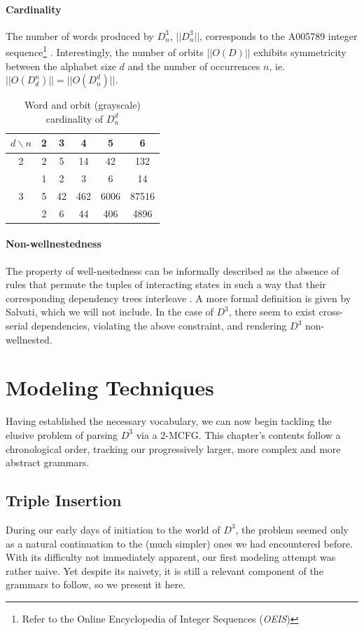 \documentclass[nonatbib,numbers,10pt]{sigplanconf}
\begin{document}
\paragraph{Cardinality}
The number of words produced by $D^3_n$, $| \! | D^3_n | \! |$, corresponds to the A005789 integer sequence\footnote{Refer to the Online Encyclopedia of Integer Sequences (\textit{OEIS})} \cite{moortgat}.
Interestingly, the number of orbits $| \! | O(D) | \! |$ exhibits symmetricity between the alphabet size $d$ and the number of occurrences $n$, ie. $| \! | O(D^n_d) | \! | = | \! | O(D^d_n) | \! |$.
\begin{table}[h!]
\begin{center}
\begin{tabular}{c | c c c c c }
$d \backslash n$ & 2 & 3 & 4 & 5 & 6\\
\hline
2 & 2 & 5 & 14 & 42 & 132\\
\rowcolor{Gray}
\ & 1 & 2 & 3 & 6 & 14\\
3 & 5 & 42 & 462 & 6006 & 87516\\
\rowcolor{Gray}
\ & 2 & 6 & 44 & 406 & 4896\\
\end{tabular}
\end{center}
\caption{Word and orbit (grayscale) cardinality of $D^d_n$}
\end{table}
\paragraph{Non-wellnestedness}
The property of well-nestedness can be informally described as the absence of rules that permute the tuples of interacting states in such a way that their corresponding dependency trees interleave \cite{joshi}. A more formal definition is given by Salvati\cite{salvati}, which we will not include. In the case of $D^3$, there seem to exist cross-serial dependencies, violating the above constraint, and rendering $D^3$ non-wellnested.

\section{Modeling Techniques}\label{sec2}
Having established the necessary vocabulary, we can now begin tackling the elusive problem of parsing $D^3$ via a 2-MCFG. This chapter's contents follow a chronological order, tracking our progressively larger, more complex and more abstract grammars.
\subsection{Triple Insertion}
During our early days of initiation to the world of $D^3$, the problem seemed only as a natural continuation to the (much simpler) ones we had encountered before. With its difficulty not immediately apparent, our first modeling attempt was rather naive. Yet despite its naivety, it is still a relevant component of the grammars to follow, so we present it here.
\end{document}

